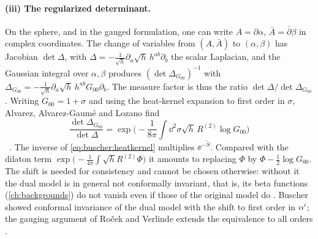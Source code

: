 \paragraph{(iii) The regularized determinant.} On the sphere, and in the gauged formulation,
one can write $A=\partial\alpha$, $\bar A=\bar\partial\beta$ in complex coordinates. The change of variables from
$(A,\bar A)$ to $(\alpha,\beta)$ has Jacobian $\det\Delta$, with
$\Delta=-\frac{1}{\sqrt h}\partial_a\sqrt h\,h^{ab}\partial_b$ the scalar Laplacian, and the
Gaussian integral over $\alpha,\beta$ produces $(\det\Delta_{G_{00}})^{-1}$ with
$\Delta_{G_{00}}=-\frac{1}{\sqrt h}\partial_a\sqrt h\,h^{ab}G_{00}\partial_b$. The measure
factor is thus the ratio $\det\Delta/\det\Delta_{G_{00}}$
. Writing $G_{00}=1+\sigma$ and using
the heat-kernel expansion to first order in $\sigma$, Alvarez, Alvarez-Gaum\'e and Lozano
find
\begin{equation}\label{eq:buscher:heatkernel}
 \frac{\det\Delta_{G_{00}}}{\det\Delta}
  =\exp\Big(-\frac{1}{8\pi}\int\dd^2\sigma\sqrt h\,R^{(2)}\log G_{00}\Big)
\end{equation}
\TL\ . The inverse of
\eqref{eq:buscher:heatkernel} multiplies $\ee^{-\tilde S}$. Compared with the dilaton term
$\exp\big(-\frac{1}{4\pi}\int\sqrt hR^{(2)}\Phi\big)$ it amounts to replacing $\Phi$ by
$\Phi-\frac12\log G_{00}$. The shift is needed for consistency and cannot be chosen
otherwise: without it the dual model is in general not conformally invariant, that is, its
beta functions (\cref{ch:backgrounds}) do not vanish even if those of the original model do
. Buscher showed conformal invariance of the dual model with the
shift to first order in $\alpha'$; the gauging argument of Ro\v{c}ek and Verlinde extends the
equivalence to all orders .

